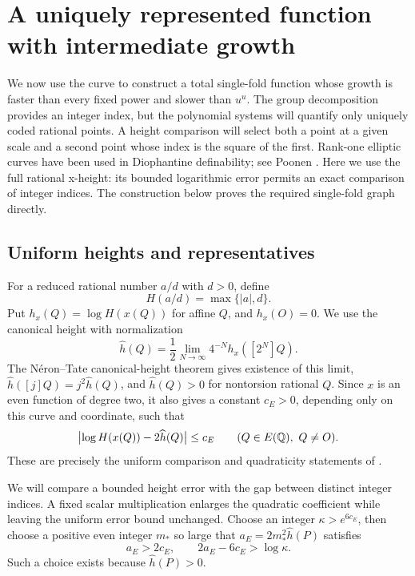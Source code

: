 \section{A uniquely represented function with intermediate growth}
\label{sec:growth}

We now use the curve to construct a total single-fold function whose
growth is faster than every fixed power and slower than \(u^u\).
The group decomposition provides an integer index, but the polynomial
systems will quantify only uniquely coded rational points.  A height
comparison will select both a point at a given scale and a second
point whose index is the square of the first.
Rank-one elliptic curves have been used in Diophantine definability;
see Poonen \cite{poonen2002}.  Here we use the full rational
x-height: its bounded logarithmic error permits an exact comparison of
integer indices.  The construction below proves the required
single-fold graph directly.

\subsection{Uniform heights and representatives}

For a reduced rational number \(a/d\) with \(d>0\), define
\[
 H(a/d)=\max\{|a|,d\}.
\]
Put \(h_x(Q)=\log H(x(Q))\) for affine \(Q\), and
\(h_x(O)=0\).  We use the canonical height with normalization
\[
 \widehat h(Q)=\frac12\lim_{N\to\infty}
                  4^{-N}h_x([2^N]Q).
\]
The N\'eron--Tate canonical-height theorem gives existence of this limit,
\(\widehat h([j]Q)=j^2\widehat h(Q)\), and
\(\widehat h(Q)>0\) for nontorsion rational \(Q\).
Since \(x\) is an even function of degree two, it also gives a
constant \(c_E>0\), depending only on this curve and coordinate,
such that
\begin{equation}\label{eq:uniform-height}
 \bigl|\log H(x(Q))-2\widehat h(Q)\bigr|\le c_E
 \qquad(Q\in E(\mathbb Q),\ Q\ne O).
\end{equation}
These are precisely the uniform comparison and quadraticity statements
of \cite[Chapter~VIII, Proposition~9.1 and Theorem~9.3]{silverman}.

We will compare a bounded height error with the gap between distinct
integer indices. A fixed scalar multiplication enlarges the quadratic
coefficient while leaving the uniform error bound unchanged. Choose an
integer \(\kappa>e^{6c_E}\), then choose a positive even integer \(m_*\)
so large that \(a_E=2m_*^2\widehat h(P)\) satisfies
\begin{equation}\label{eq:height-constants}
 a_E>2c_E,
 \qquad 2a_E-6c_E>\log\kappa.
\end{equation}
Such a choice exists because \(\widehat h(P)>0\).

